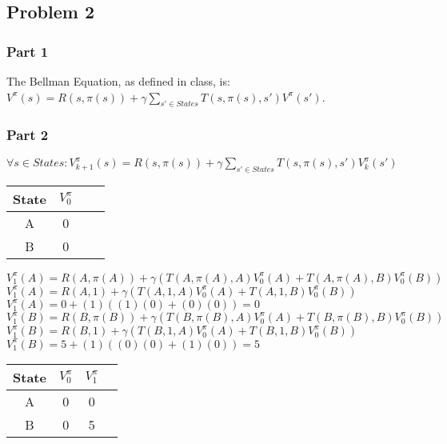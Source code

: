 \documentclass{article}
\begin{document}
\subsection*{Problem 2}

\subsubsection*{Part 1} 

The Bellman Equation, as defined in class, is: $V^{\pi}(s) = R(s, \pi (s)) + \gamma \sum_{s' \in States} T(s, \pi (s), s')V^{\pi}(s')$.

\subsubsection*{Part 2} 

$\forall s \in States: V^{\pi}_{k+1}(s) = R(s, \pi (s)) + \gamma \sum_{s' \in States} T(s, \pi (s), s')V^{\pi}_k(s')$\\

\begin{table}[!h]
    \centering
    \small
    \begin{tabular}{cccc}
        \hline
         State & $V^{\pi}_0$\\
         \hline
         A & 0\\
         B & 0\\
        \hline
    \end{tabular}
    \label{tab:my_label}
\end{table}

$V^{\pi}_1(A) = R(A, \pi (A)) + \gamma (T(A, \pi (A), A)V^{\pi}_0(A) + T(A, \pi (A), B)V^{\pi}_0(B))$\\

$V^{\pi}_1(A) = R(A, 1) + \gamma (T(A, 1, A)V^{\pi}_0(A) + T(A, 1, B)V^{\pi}_0(B))$\\

$V^{\pi}_1(A) = 0 + (1)((1)(0) + (0)(0)) = 0$\\

$V^{\pi}_1(B) = R(B, \pi (B)) + \gamma (T(B, \pi (B), A)V^{\pi}_0(A) + T(B, \pi (B), B)V^{\pi}_0(B))$\\

$V^{\pi}_1(B) = R(B, 1) + \gamma (T(B, 1, A)V^{\pi}_0(A) + T(B, 1, B)V^{\pi}_0(B))$\\

$V^{\pi}_1(B) = 5 + (1)((0)(0) + (1)(0)) = 5$\\

\begin{table}[!h]
    \centering
    \small
    \begin{tabular}{cccc}
        \hline
         State & $V^{\pi}_0$ & $V^{\pi}_1$\\
         \hline
         A & 0 & 0\\
         B & 0 & 5\\
        \hline
    \end{tabular}
    \label{tab:my_label}
\end{table}
\end{document}
